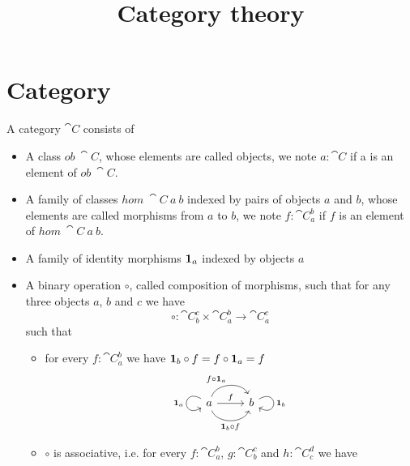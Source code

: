 \documentclass[12pt]{article}
\title{Category theory}
\begin{document}
\section{Category}

\newcommand{\morphs}[3]{\cat{#1}_{#2}^{#3}}

\begin{definition}
    A category \(\cat{C}\) consists of 
    \begin{itemize}
        \item A class \(ob~\cat{C}\), whose elements are called objects, we note \(a : \cat{C}\) if
            a is an element of \(ob~\cat{C}\).
        \item A family of classes \(hom~\cat{C}~{a}~{b}\) indexed by pairs of objects \(a\) and \(b\), 
            whose elements are called morphisms from \(a\) to \(b\), we note \(f : \morphs{C}{a}{b}\)
            if \(f\) is an element of \(hom~\cat{C}~{a}~{b}\).
        \item A family of identity morphisms \(\idarrow[a]\) indexed by objects \(a\)
        \item A binary operation \(\circ\), called composition of morphisms, such that 
            for any three objects \(a\), \(b\) and \(c\) we have 
            \begin{equation*}
                \circ : \morphs{C}{b}{c} \times \morphs{C}{a}{b} \rightarrow \morphs{C}{a}{c}    
            \end{equation*}
            such that 
            \begin{itemize}
                \item for every \(f : \morphs{C}{a}{b}\) we have
                \(\idarrow[b] \circ f = f \circ \idarrow[a] = f\)
                \begin{equation*}
                    \begin{tikzcd}
                        a   \arrow[r,"f"]
                            \arrow[loop,out=150,in=210,distance=20,swap,"{\mathbf{1}}_a"]
                            \arrow[r,bend left =70,"f\circ{\mathbf{1}}_a"] 
                            \arrow[r, bend right = 70,swap,"{\mathbf{1}}_b\circ f"]&
                        b   \arrow[loop,out=30,in=-30,distance=20,"{\mathbf{1}}_b"]
                    \end{tikzcd}
                \end{equation*}
                \item $\circ$ is associative, i.e. for every \(f : \morphs{C}{a}{b}\), 
                \(g : \morphs{C}{b}{c}\) and \(h : \morphs{C}{c}{d}\) we have

\end{itemize}
\end{itemize}
\end{definition}
\end{document}
